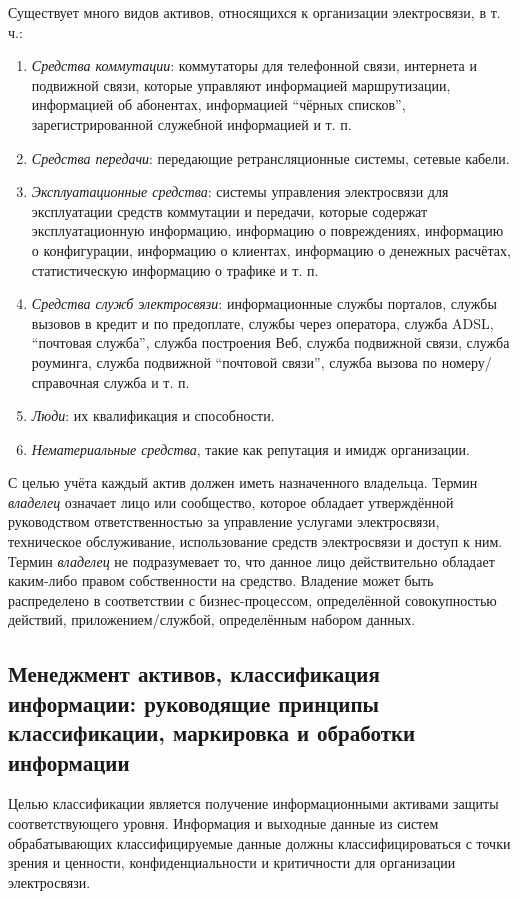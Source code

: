 \documentclass[12pt, russian, oneside, article]{ncc}
\begin{document}
Существует много видов активов, относящихся к организации электросвязи, в т. ч.:
\begin{enumerate}
\item \emph{Средства коммутации}: коммутаторы для телефонной связи, интернета и подвижной связи, которые управляют информацией маршрутизации, информацией об абонентах, информацией ``чёрных списков'', зарегистрированной служебной информацией и т. п.
\item \emph{Средства передачи}: передающие ретрансляционные системы, сетевые кабели.
\item \emph{Эксплуатационные средства}: системы управления электросвязи для эксплуатации средств коммутации и передачи, которые содержат эксплуатационную информацию, информацию о повреждениях, информацию о конфигурации, информацию о клиентах, информацию о денежных расчётах, статистическую информацию о трафике и т. п.
\item \emph{Средства служб электросвязи}: информационные службы порталов, службы вызовов в кредит и по предоплате, службы через оператора, служба ADSL, ``почтовая служба'', служба построения Веб, служба подвижной связи, служба роуминга, служба подвижной ``почтовой связи'', служба вызова по номеру/справочная служба и т. п.
\item \emph{Люди}: их квалификация и способности.
\item \emph{Нематериальные средства}, такие как репутация и имидж организации.
\end{enumerate}

С целью учёта каждый актив должен иметь назначенного владельца. Термин \emph{владелец} означает лицо или сообщество, которое обладает утверждённой руководством ответственностью за управление услугами электросвязи, техническое обслуживание, использование средств электросвязи и доступ к ним. Термин \emph{владелец} не подразумевает то, что данное лицо действительно обладает каким-либо правом собственности на средство. Владение может быть распределено в соответствии с бизнес-процессом, определённой совокупностью действий, приложением/службой, определённым набором данных.
\subsection{Менеджмент активов, классификация информации: руководящие принципы классификации, маркировка и обработки информации}
\label{sec-5_3}


Целью классификации является получение информационными активами защиты соответствующего уровня. Информация и выходные данные из систем обрабатывающих классифицируемые данные должны классифицироваться с точки зрения и ценности, конфиденциальности и критичности для организации электросвязи.
\end{document}
